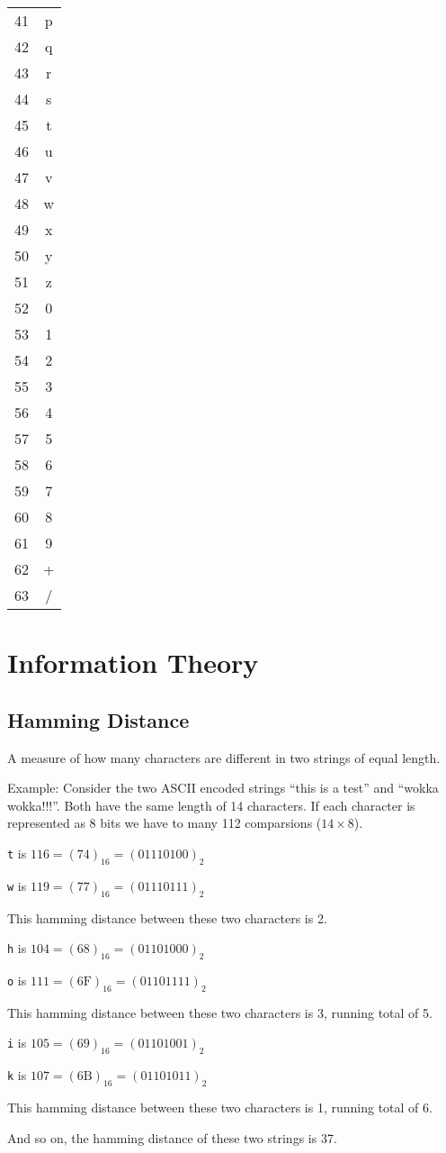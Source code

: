 \documentclass[12pt]{book}
\begin{document}
{\begin{tabular}{c c}
    41 & p \\
    42 & q \\
    43 & r \\
    44 & s \\
    45 & t \\
    46 & u \\
    47 & v \\
    48 & w \\
    49 & x \\
    50 & y \\
    51 & z \\
    52 & 0 \\
    53 & 1 \\
    54 & 2 \\
    55 & 3 \\
    56 & 4 \\
    57 & 5 \\
    58 & 6 \\
    59 & 7 \\
    60 & 8 \\
    61 & 9 \\
    62 & + \\
    63 & / \\
  \end{tabular}}

  \chapter{Information Theory}

  \section{Hamming Distance}

  A measure of how many characters are different in two strings of equal length.

  Example: Consider the two ASCII encoded strings ``this is a test'' and ``wokka
  wokka!!!''. Both have the same length of 14 characters. If each character is
  represented as 8 bits we have to many 112 comparsions ($14 \times 8$).

  \texttt{t} is $116 = (74)_{16} = (01110100)_{2}$

  \texttt{w} is $119 = (77)_{16} = (01110111)_{2}$

  This hamming distance between these two characters is 2.

  \texttt{h} is $104 = (68)_{16} = (01101000)_{2}$

  \texttt{o} is $111 = (6\text{F})_{16} = (01101111)_{2}$

  This hamming distance between these two characters is 3, running total of 5.

  \texttt{i} is $105 = (69)_{16} = (01101001)_{2}$

  \texttt{k} is $107 = (6\text{B})_{16} = (01101011)_{2}$

  This hamming distance between these two characters is 1, running total of 6.

  And so on, the hamming distance of these two strings is 37.
\end{document}
